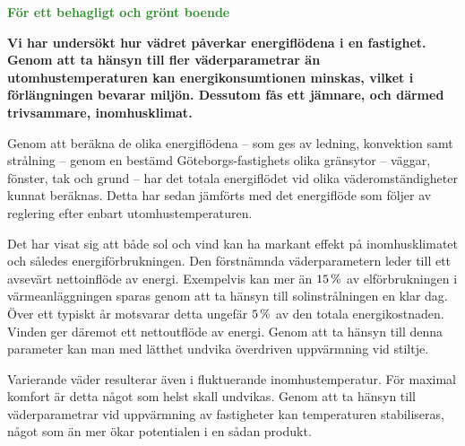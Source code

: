 \documentclass[11pt,a4paper]{article}
\begin{document}
\addtolength{\parindent}{-0.6 cm}
\pagestyle{fancy}
\rhead{\sc\footnotesize \today}
\mbox{}

\begin{center}
\textcolor{ForestGreen}{\textbf{\Huge För ett behagligt och grönt boende}}
\end{center}

\mbox{}

\setlength{\columnsep}{5mm}
\begin{multicols}{2}
\addtolength{\parskip}{1.2ex}
\linespread{1.02}
\normalsize



\textbf{Vi har undersökt hur vädret påverkar energiflödena i en fastighet. Genom att ta hänsyn till fler väderparametrar än utomhustemperaturen kan energikonsumtionen minskas, vilket i förlängningen bevarar miljön. Dessutom fås ett jämnare, och därmed trivsammare, inomhusklimat.}

Genom att beräkna de olika energiflödena – som ges av ledning, konvektion samt strålning – genom en bestämd Göteborgs-fastighets olika gränsytor – väggar, fönster, tak och grund – har det totala energiflödet vid olika väderomständigheter kunnat beräknas. Detta har sedan jämförts med det energiflöde som följer av reglering efter enbart utomhustemperaturen.

Det har visat sig att både sol och vind kan
ha markant effekt på inomhusklimatet och således energiförbrukningen. Den 
förstnämnda väderparametern leder till ett avsevärt nettoinflöde av energi. Exempelvis kan mer än $\unit[15]{\%}$ av elförbrukningen i värmeanläggningen sparas genom att ta hänsyn till solinstrålningen en klar dag. Över ett typiskt år motsvarar detta ungefär $\unit[5]{\%}$ av den totala energikostnaden. Vinden
ger däremot ett nettoutflöde av energi. Genom att ta hänsyn till denna parameter kan man med lätthet undvika överdriven uppvärmning vid stiltje.

Varierande väder resulterar även i fluktuerande inomhustemperatur. För maximal komfort är detta något som helst skall undvikas. Genom att ta hänsyn till väderparametrar vid uppvärmning av fastigheter kan temperaturen stabiliseras, något som än mer ökar potentialen i en sådan produkt.


\end{multicols}
\end{document}

